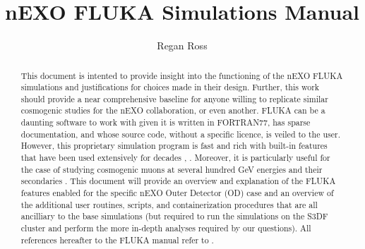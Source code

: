 \documentclass[10pt]{article}
\title{nEXO FLUKA Simulations Manual}
\author{Regan Ross}
\begin{document}
\begin{titlepage}
    \maketitle
    \vspace{4cm}
    \centering
\end{titlepage}

\begin{abstract}
    This document is intented to provide insight into the functioning of the nEXO FLUKA simulations and justifications for choices made in their design. Further, this work should provide a near comprehensive baseline for anyone willing to replicate similar cosmogenic studies for the nEXO collaboration, or even another. FLUKA can be a daunting software to work with given it is written in FORTRAN77, has sparse documentation, and whose source code, without a specific licence, is veiled to the user. However, this proprietary simulation program is fast and rich with built-in features that have been used extensively for decades \cite{FLUKA1}, \cite{FLUKA2}. Moreover, it is particularly useful for the case of studying cosmogenic muons at several hundred GeV energies and their secondaries \cite{gratta_muons_to_neutrons} \cite{KamLand_Zen}. This document will provide an overview and explanation of the FLUKA features enabled for the specific nEXO Outer Detector (OD) case and an overview of the additional user routines, scripts, and containerization procedures that are all ancilliary to the base simulations (but required to run the simulations on the S3DF cluster and perform the more in-depth analyses required by our questions).  All references hereafter to the FLUKA manual refer to \cite{FLUKA_Manual}.


\end{abstract}

\vspace{1.5cm}
\listoffigures

\newpage
\tableofcontents

\break

\end{document}

